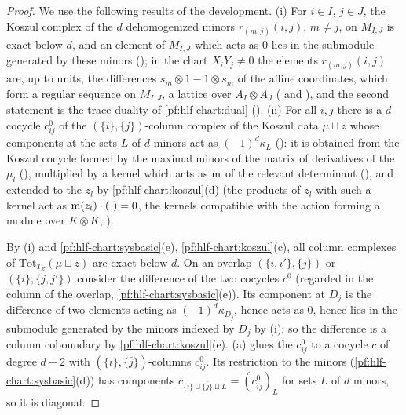 \begin{proof}
We use the following results of the development.
(i) For $i\in I$, $j\in J$, the Koszul complex of the $d$ dehomogenized minors $r_{(m,j)}(i,j)$, $m\ne j$, on $M_{I,J}$ is exact below $d$,
and an element of $M_{I,J}$ which acts as $0$ lies in the submodule generated by these minors
(); in the chart $X_iY_j\ne0$ the elements $r_{(m,j)}(i,j)$ are, up to units, the
differences $s_m\otimes1-1\otimes s_m$ of the affine coordinates, which form a regular sequence on $M_{I,J}$, a lattice over $A_I\otimes A_J$
( and ), and the second statement
is the trace duality of \cref{pf:hlf-chart:dual} ().
(ii) For all $i,j$ there is a $d$-cocycle $c^0_{ij}$ of the $(\{i\},\{j\})$-column complex of the Koszul data $\mu\sqcup z$ whose components at the
sets $L$ of $d$ minors act as $(-1)^d\kappa_L$ (): it is obtained from the Koszul cocycle
formed by the maximal minors of the matrix of derivatives of the $\mu_l$ (), multiplied
by a kernel which acts as $\operatorname{m}$ of the relevant determinant (), and extended to the
$z_l$ by \cref{pf:hlf-chart:koszul}(d) (the products of $z_l$ with such a kernel act as $\operatorname{m}(z_l)\cdot(\ )=0$, the kernels compatible with the
action forming a module over $K\otimes K$, ).

By (i) and \cref{pf:hlf-chart:sysbasic}(e), \cref{pf:hlf-chart:koszul}(c), all column complexes of $\mathrm{Tot}_{T_Z}(\mu\sqcup z)$ are exact below $d$.
On an overlap $(\{i,i'\},\{j\})$ or $(\{i\},\{j,j'\})$ consider the difference of the two cocycles $c^0$ (regarded in the column of the overlap,
\cref{pf:hlf-chart:sysbasic}(e)). Its component at $D_j$ is the difference of two elements acting as $(-1)^d\kappa_{D_j}$, hence acts as $0$, hence
lies in the submodule generated by the minors indexed by $D_j$ by (i); so the difference is a column coboundary by \cref{pf:hlf-chart:koszul}(e).
(a) glues the $c^0_{ij}$ to a cocycle $c$ of degree $d+2$ with $(\{i\},\{\bar j\})$-columns $c^0_{ij}$. Its restriction to the
minors (\cref{pf:hlf-chart:sysbasic}(d)) has components $c_{\{i\}\sqcup\{\bar j\}\sqcup L}=(c^0_{ij})_L$ for sets $L$ of $d$ minors, so it is diagonal.
\end{proof}

